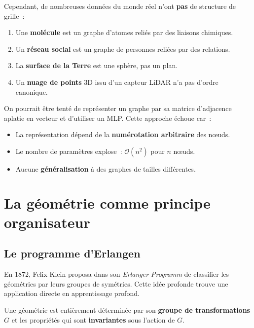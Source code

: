 Cependant, de nombreuses donn\'ees du monde r\'eel n'ont \textbf{pas} de structure
de grille~:

\begin{exemple}
\begin{enumerate}
    \item Une \textbf{mol\'ecule} est un graphe d'atomes reli\'es par des liaisons chimiques.
    \item Un \textbf{r\'eseau social} est un graphe de personnes reli\'ees par des relations.
    \item La \textbf{surface de la Terre} est une sph\`ere, pas un plan.
    \item Un \textbf{nuage de points} 3D issu d'un capteur LiDAR n'a pas d'ordre canonique.
\end{enumerate}
\end{exemple}

\begin{attention}[title=\textbf{Pourquoi ne pas simplement vectoriser~?}]
On pourrait \^etre tent\'e de repr\'esenter un graphe par sa matrice d'adjacence
aplatie en vecteur et d'utiliser un MLP. Cette approche \'echoue car~:
\begin{itemize}
    \item La repr\'esentation d\'epend de la \textbf{num\'erotation arbitraire} des n\oe uds.
    \item Le nombre de param\`etres explose~: $\mathcal{O}(n^2)$ pour $n$ n\oe uds.
    \item Aucune \textbf{g\'en\'eralisation} \`a des graphes de tailles diff\'erentes.
\end{itemize}
\end{attention}

\section{La g\'eom\'etrie comme principe organisateur}

\subsection{Le programme d'Erlangen}

En 1872, Felix Klein proposa dans son \textit{Erlanger Programm} de classifier
les g\'eom\'etries par leurs groupes de sym\'etries. Cette id\'ee profonde trouve
une application directe en apprentissage profond.

\begin{theoreme}
Une g\'eom\'etrie est enti\`erement d\'etermin\'ee par son \textbf{groupe de
transformations} $G$ et les propri\'et\'es qui sont \textbf{invariantes} sous
l'action de $G$.
\end{theoreme}

